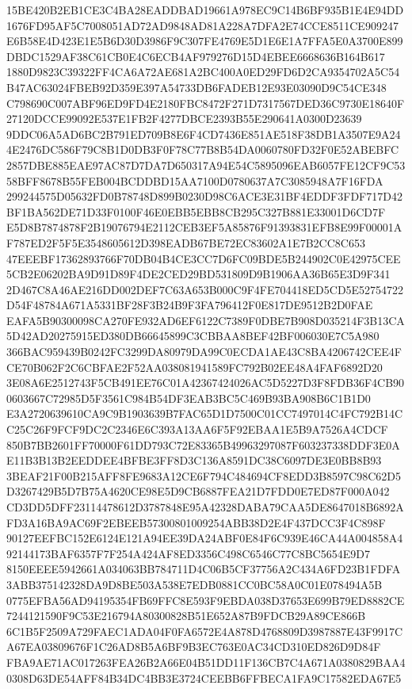 \documentclass[UTF8,fontset=fandol,zihao=-4,a4paper]{ctexart}
\begin{document}
{{15BE420B2EB1CE3C4BA28EADDBAD19661A978EC9C14B6BF935B1E4E94DD1676FD95AF5C7008051AD72AD9848AD81A228A7DFA2E74CCE8511CE909247
E6B58E4D423E1E5B6D30D3986F9C307FE4769E5D1E6E1A7FFA5E0A3700E899DBDC1529AF38C61CB0E4C6ECB4AF979276D15D4EBEE6668636B164B617
1880D9823C39322FF4CA6A72AE681A2BC400A0ED29FD6D2CA9354702A5C54B47AC63024FBEB92D359E397A54733DB6FADEB12E93E03090D9C54CE348
C798690C007ABF96ED9FD4E2180FBC8472F271D7317567DED36C9730E18640F27120DCCE99092E537E1FB2F4277DBCE2393B55E290641A0300D23639
9DDC06A5AD6BC2B791ED709B8E6F4CD7436E851AE518F38DB1A3507E9A244E2476DC586F79C8B1D0DB3F0F78C77B8B54DA0060780FD32F0E52ABEBFC
2857DBE885EAE97AC87D7DA7D650317A94E54C5895096EAB6057FE12CF9C5358BFF8678B55FEB004BCDDBD15AA7100D0780637A7C3085948A7F16FDA
299244575D05632FD0B78748D899B0230D98C6ACE3E31BF4EDDF3FDF717D42BF1BA562DE71D33F0100F46E0EBB5EBB8CB295C327B881E33001D6CD7F
E5D8B7874878F2B19076794E2112CEB3EF5A85876F91393831EFB8E99F00001AF787ED2F5F5E3548605612D398EADB67BE72EC83602A1E7B2CC8C653
47EEEBF17362893766F70DB04B4CE3CC7D6FC09BDE5B244902C0E42975CEE5CB2E06202BA9D91D89F4DE2CED29BD531809D9B1906AA36B65E3D9F341
2D467C8A46AE216DD002DEF7C63A653B000C9F4FE704418ED5CD5E52754722D54F48784A671A5331BF28F3B24B9F3FA796412F0E817DE9512B2D0FAE
EAFA5B90300098CA270FE932AD6EF6122C7389F0DBE7B908D035214F3B13CA5D42AD20275915ED380DB66645899C3CBBAA8BEF42BF006030E7C5A980
366BAC959439B0242FC3299DA80979DA99C0ECDA1AE43C8BA4206742CEE4FCE70B062F2C6CBFAE2F52AA038081941589FC792B02EE48A4FAF6892D20
3E08A6E2512743F5CB491EE76C01A42367424026AC5D5227D3F8FDB36F4CB900603667C72985D5F3561C984B54DF3EAB3BC5C469B93BA908B6C1B1D0
E3A2720639610CA9C9B1903639B7FAC65D1D7500C01CC7497014C4FC792B14CC25C26F9FCF9DC2C2346E6C393A13AA6F5F92EBAA1E5B9A7526A4CDCF
850B7BB2601FF70000F61DD793C72E83365B49963297087F603237338DDF3E0AE11B3B13B2EEDDEE4BFBE3FF8D3C136A8591DC38C6097DE3E0BB8B93
3BEAF21F00B215AFF8FE9683A12CE6F794C484694CF8EDD3B8597C98C62D5D3267429B5D7B75A4620CE98E5D9CB6887FEA21D7FDD0E7ED87F000A042
CD3DD5DFF23114478612D3787848E95A42328DABA79CAA5DE8647018B6892AFD3A16BA9AC69F2EBEEB57300801009254ABB38D2E4F437DCC3F4C898F
90127EEFBC152E6124E121A94EE39DA24ABF0E84F6C939E46CA44A004858A492144173BAF6357F7F254A424AF8ED3356C498C6546C77C8BC5654E9D7
8150EEEE5942661A034063BB784711D4C06B5CF37756A2C434A6FD23B1FDFA3ABB375142328DA9D8BE503A538E7EDB0881CC0BC58A0C01E078494A5B
0775EFBA56AD94195354FB69FFC8E593F9EBDA038D37653E699B79ED8882CE7244121590F9C53E216794A80300828B51E652A87B9FDCB29A89CE866B
6C1B5F2509A729FAEC1ADA04F0FA6572E4A878D4768809D3987887E43F9917CA67EA03809676F1C26AD8B5A6BF9B3EC763E0AC34CD310ED826D9D84F
FBA9AE71AC017263FEA26B2A66E04B51DD11F136CB7C4A671A0380829BAA40308D63DE54AFF84B34DC4BB3E3724CEEBB6FFBECA1FA9C17582EDA67E5
}}
\end{document}
